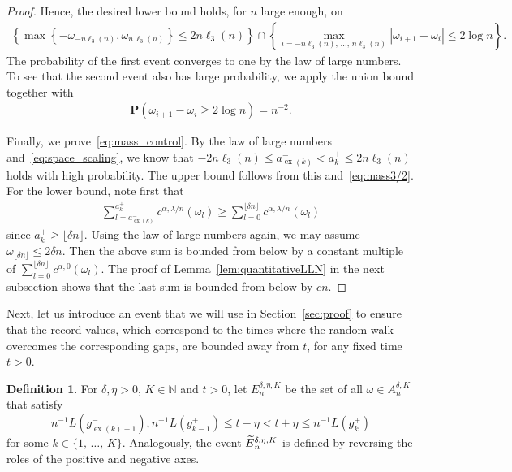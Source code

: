 \documentclass[10pt]{amsart}
\theoremstyle{definition}\newtheorem{defi}[theo]{Definition}\newtheorem{rema}[theo]{Remark}\newtheorem{exam}[theo]{Example}\newtheorem{exem}[theo]{Example}\newtheorem{nota}[theo]{Notation}
\newcommand{\N}{\mathbb N}
\newcommand{\bfP}{\mathbf{P}}
\newcommand\ex{\operatorname{ex}}
\newcommand{\aat}[1]{a_{\ex(#1)}^-}
\newcommand{\gtt}[1]{g_{\ex(#1)-1}^-}
\let\oldtilde\tilde
\renewcommand*{\tilde}[1]{\mathchoice{\widetilde{#1}}{\widetilde{#1}}{\oldtilde{#1}}{\oldtilde{#1}}}
\begin{document}
\begin{proof}
Hence, the desired lower bound holds, for $n$ large enough, on
\begin{align*}
\left\{\max\left\{-\omega_{-n\ell_3(n)},\omega_{n\,\ell_3(n)}\right\}\leq 2n\ell_3(n)\right\}\cap\left\{\max_{i=-n\ell_3(n),\,\dots,\,n\ell_3(n)}\left|\omega_{i+1}-\omega_i\right|\leq 2\log n\right\}.
\end{align*}
The probability of the first event converges to one by the law of large numbers. To see that the second event also has large probability, we apply the union bound together with
\begin{align*}
\bfP(\omega_{i+1}-\omega_i\geq 2\log n)=n^{-2}.
\end{align*}

Finally, we prove~\eqref{eq:mass_control}. By the law of large numbers and~\eqref{eq:space_scaling}, we know that $-2n\ell_3(n)\le \aat{k}< a_k^+\le 2n\ell_3(n)$ holds with high probability. The upper bound follows from this and~\eqref{eq:mass3/2}. For the lower bound, note first that
\begin{align*}
\sum_{l=\aat{k}}^{a_k^+} c^{\alpha,\lambda/n}(\omega_l)
\ge \sum_{l=0}^{\lfloor \delta n \rfloor} c^{\alpha,\lambda/n}(\omega_l)
\end{align*}
since $a_k^+ \ge \lfloor \delta n \rfloor$. Using the law of large numbers again, we may assume $\omega_{\lfloor \delta n \rfloor} \le 2\delta n$. Then the above sum is bounded from below by a constant multiple of $\sum_{l=0}^{\lfloor \delta n \rfloor} c^{\alpha,0}(\omega_l)$. The proof of Lemma~\ref{lem:quantitativeLLN} in the next subsection shows that the last sum is bounded from below by $cn$.
\end{proof}

Next, let us introduce an event that we will use in Section~\ref{sec:proof} to ensure that the record values, which correspond to the times where the random walk overcomes the corresponding gaps, are bounded away from $t$, for any fixed time $t>0$.

\begin{defi}\label{def:E}
For $\delta, \eta>0$, $K\in\N$ and $t>0$, let $E_n^{\delta,\eta,K}$ be the set of all $\omega\in A_n^{\delta,K}$ that satisfy
\[
n^{-1}L\left(\gtt{k}\right),n^{-1}L\left(g_{k-1}^+\right)\leq t-\eta<t+\eta\leq n^{-1}L\left(g_{k}^+\right)
\]
for some $k\in\{1,\,\dots,\,K\}$. Analogously, the event $\tilde{E}_n^{\delta,\eta,K}$ is defined by reversing the roles of the positive and negative axes.
\end{defi}
\end{document}
